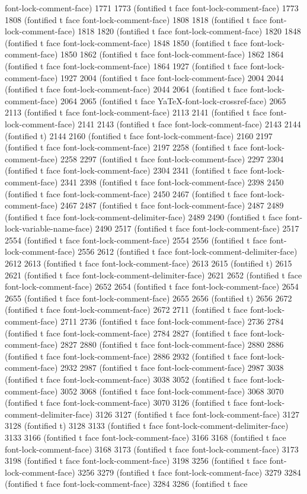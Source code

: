 {{font-lock-comment-face) 1771 1773 (fontified t face font-lock-comment-face) 1773 1808 (fontified t face font-lock-comment-face) 1808 1818 (fontified t face font-lock-comment-face) 1818 1820 (fontified t face font-lock-comment-face) 1820 1848 (fontified t face font-lock-comment-face) 1848 1850 (fontified t face font-lock-comment-face) 1850 1862 (fontified t face font-lock-comment-face) 1862 1864 (fontified t face font-lock-comment-face) 1864 1927 (fontified t face font-lock-comment-face) 1927 2004 (fontified t face font-lock-comment-face) 2004 2044 (fontified t face font-lock-comment-face) 2044 2064 (fontified t face font-lock-comment-face) 2064 2065 (fontified t face YaTeX-font-lock-crossref-face) 2065 2113 (fontified t face font-lock-comment-face) 2113 2141 (fontified t face font-lock-comment-face) 2141 2143 (fontified t face font-lock-comment-face) 2143 2144 (fontified t) 2144 2160 (fontified t face font-lock-comment-face) 2160 2197 (fontified t face font-lock-comment-face) 2197 2258 (fontified t face font-lock-comment-face) 2258 2297 (fontified t face font-lock-comment-face) 2297 2304 (fontified t face font-lock-comment-face) 2304 2341 (fontified t face font-lock-comment-face) 2341 2398 (fontified t face font-lock-comment-face) 2398 2450 (fontified t face font-lock-comment-face) 2450 2467 (fontified t face font-lock-comment-face) 2467 2487 (fontified t face font-lock-comment-face) 2487 2489 (fontified t face font-lock-comment-delimiter-face) 2489 2490 (fontified t face font-lock-variable-name-face) 2490 2517 (fontified t face font-lock-comment-face) 2517 2554 (fontified t face font-lock-comment-face) 2554 2556 (fontified t face font-lock-comment-face) 2556 2612 (fontified t face font-lock-comment-delimiter-face) 2612 2613 (fontified t face font-lock-comment-face) 2613 2615 (fontified t) 2615 2621 (fontified t face font-lock-comment-delimiter-face) 2621 2652 (fontified t face font-lock-comment-face) 2652 2654 (fontified t face font-lock-comment-face) 2654 2655 (fontified t face font-lock-comment-face) 2655 2656 (fontified t) 2656 2672 (fontified t face font-lock-comment-face) 2672 2711 (fontified t face font-lock-comment-face) 2711 2736 (fontified t face font-lock-comment-face) 2736 2784 (fontified t face font-lock-comment-face) 2784 2827 (fontified t face font-lock-comment-face) 2827 2880 (fontified t face font-lock-comment-face) 2880 2886 (fontified t face font-lock-comment-face) 2886 2932 (fontified t face font-lock-comment-face) 2932 2987 (fontified t face font-lock-comment-face) 2987 3038 (fontified t face font-lock-comment-face) 3038 3052 (fontified t face font-lock-comment-face) 3052 3068 (fontified t face font-lock-comment-face) 3068 3070 (fontified t face font-lock-comment-face) 3070 3126 (fontified t face font-lock-comment-delimiter-face) 3126 3127 (fontified t face font-lock-comment-face) 3127 3128 (fontified t) 3128 3133 (fontified t face font-lock-comment-delimiter-face) 3133 3166 (fontified t face font-lock-comment-face) 3166 3168 (fontified t face font-lock-comment-face) 3168 3173 (fontified t face font-lock-comment-face) 3173 3198 (fontified t face font-lock-comment-face) 3198 3256 (fontified t face font-lock-comment-face) 3256 3279 (fontified t face font-lock-comment-face) 3279 3284 (fontified t face font-lock-comment-face) 3284 3286 (fontified t face }}
